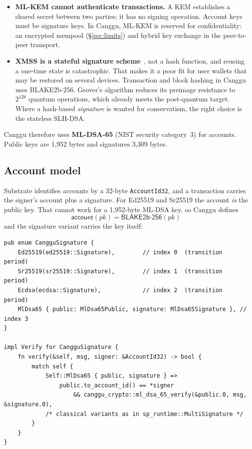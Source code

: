 \documentclass[11pt]{article}
\theoremstyle{definition}
\theoremstyle{remark}
\begin{document}
\begin{itemize}[leftmargin=*]
  \item \textbf{ML-KEM cannot authenticate transactions.} A KEM establishes a shared secret between
        two parties; it has no signing operation. Account keys must be signature keys. In Canggu,
        ML-KEM is reserved for confidentiality: an encrypted mempool (\S\ref{sec:limits}) and
        hybrid key exchange in the peer-to-peer transport.
  \item \textbf{XMSS is a stateful signature scheme}~\cite{sp800208}, not a hash function, and
        reusing a one-time state is catastrophic. That makes it a poor fit for user wallets that
        may be restored on several devices. Transaction and block hashing in Canggu uses
        BLAKE2b-256. Grover's algorithm reduces its preimage resistance to $2^{128}$ quantum
        operations, which already meets the post-quantum target. Where a hash-based
        \emph{signature} is wanted for conservatism, the right choice is the stateless SLH-DSA.
\end{itemize}

Canggu therefore uses \textbf{ML-DSA-65} (NIST security category~3) for accounts. Public keys are
1{,}952 bytes and signatures 3{,}309 bytes.

\subsection{Account model}

Substrate identifies accounts by a 32-byte \texttt{AccountId32}, and a transaction carries the
signer's account plus a signature. For Ed25519 and Sr25519 the account \emph{is} the public key.
That cannot work for a 1{,}952-byte ML-DSA key, so Canggu defines
\[
  \mathsf{account}(pk) = \mathsf{BLAKE2b\text{-}256}(pk)
\]
and the signature variant carries the key itself:

\begin{lstlisting}
pub enum CangguSignature {
    Ed25519(ed25519::Signature),        // index 0  (transition period)
    Sr25519(sr25519::Signature),        // index 1  (transition period)
    Ecdsa(ecdsa::Signature),            // index 2  (transition period)
    MlDsa65 { public: MlDsa65Public, signature: MlDsa65Signature }, // index 3
}

impl Verify for CangguSignature {
    fn verify(&self, msg, signer: &AccountId32) -> bool {
        match self {
            Self::MlDsa65 { public, signature } =>
                public.to_account_id() == *signer
                    && canggu_crypto::ml_dsa_65_verify(&public.0, msg, &signature.0),
            /* classical variants as in sp_runtime::MultiSignature */
        }
    }
}
\end{lstlisting}
\end{document}
